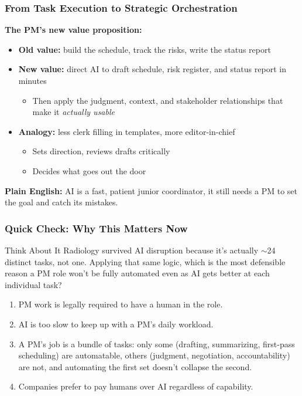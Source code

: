 \begin{frame}[fragile]\frametitle{From Task Execution to Strategic Orchestration}

\textbf{The PM's new value proposition:}
\begin{itemize}
  \item \textbf{Old value:} build the schedule, track the risks, write the status report
  \item \textbf{New value:} direct AI to draft schedule, risk register, and status report in minutes
    \begin{itemize}
      \item Then apply the judgment, context, and stakeholder relationships that make it \textit{actually usable}
    \end{itemize}
  \item \textbf{Analogy:} less clerk filling in templates, more editor-in-chief
    \begin{itemize}
      \item Sets direction, reviews drafts critically
      \item Decides what goes out the door
    \end{itemize}
\end{itemize}

\vspace{0.3em}
\textbf{Plain English:} AI is a fast, patient junior coordinator, it still needs a PM to set the goal and catch its mistakes.

\end{frame}

\begin{frame}[fragile]\frametitle{Quick Check: Why This Matters Now}
\begin{block}{Think About It}
Radiology survived AI disruption because it's actually $\sim$24 distinct tasks, not one. Applying that same logic, which is the most defensible reason a PM role won't be fully automated even as AI gets better at each individual task?
\begin{enumerate}
  \item[A.] PM work is legally required to have a human in the role.
  \item[B.] AI is too slow to keep up with a PM's daily workload.
  \item[C.] A PM's job is a bundle of tasks: only some (drafting, summarizing, first-pass scheduling) are automatable, others (judgment, negotiation, accountability) are not, and automating the first set doesn't collapse the second.
  \item[D.] Companies prefer to pay humans over AI regardless of capability.
\end{enumerate}
\end{block}
\end{frame}

